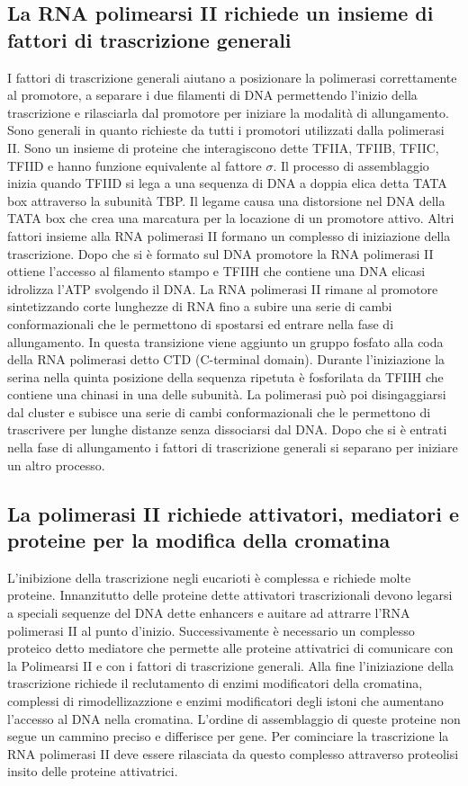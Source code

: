 \subsection{La RNA polimearsi II richiede un insieme di fattori di trascrizione generali}
I fattori di trascrizione generali aiutano a posizionare la polimerasi correttamente al promotore, a separare i due filamenti di DNA permettendo l'inizio della trascrizione e rilasciarla
dal promotore per iniziare la modalit\`a di allungamento. Sono generali in quanto richieste da tutti i promotori utilizzati dalla polimerasi II. Sono un insieme di proteine che 
interagiscono dette TFIIA, TFIIB, TFIIC, TFIID e hanno funzione equivalente al fattore $\sigma$. Il processo di assemblaggio inizia quando TFIID si lega a una sequenza di DNA a doppia 
elica detta TATA box attraverso la subunit\`a TBP. Il legame causa una distorsione nel DNA della TATA box che crea una marcatura per la locazione di un promotore attivo. Altri fattori
insieme alla RNA polimerasi II formano un complesso di iniziazione della trascrizione. Dopo che si \`e formato sul DNA promotore la RNA polimerasi II ottiene l'accesso al filamento 
stampo e TFIIH che contiene una DNA elicasi idrolizza l'ATP svolgendo il DNA. La RNA polimerasi II rimane al promotore sintetizzando corte lunghezze di RNA fino a subire una serie di
cambi conformazionali che le permettono di spostarsi ed entrare nella fase di allungamento. In questa transizione viene aggiunto un gruppo fosfato alla coda della RNA polimerasi detto 
CTD (C-terminal domain). Durante l'iniziazione la serina nella quinta posizione della sequenza ripetuta \`e fosforilata da TFIIH che contiene una chinasi in una delle subunit\`a. La
polimerasi pu\`o poi disingaggiarsi dal cluster e subisce una serie di cambi conformazionali che le permettono di trascrivere per lunghe distanze senza dissociarsi dal DNA. Dopo che si
\`e entrati nella fase di allungamento i fattori di trascrizione generali si separano per iniziare un altro processo. 
\subsection{La polimerasi II richiede attivatori, mediatori e proteine per la modifica della cromatina}
L'inibizione della trascrizione negli eucarioti \`e complessa e richiede molte proteine. Innanzitutto delle proteine dette attivatori trascrizionali devono legarsi a speciali sequenze
del DNA dette enhancers e auitare ad attrarre l'RNA polimerasi II al punto d'inizio. Successivamente \`e necessario un complesso proteico detto mediatore che permette alle proteine 
attivatrici di comunicare con la Polimearsi II e con i fattori di trascrizione generali. Alla fine l'iniziazione della trascrizione richiede il reclutamento di enzimi modificatori della
cromatina, complessi di rimodellizazzione e enzimi modificatori degli istoni che aumentano l'accesso al DNA nella cromatina. L'ordine di assemblaggio di queste proteine non segue un 
cammino preciso e differisce per gene. Per cominciare la trascrizione la RNA polimerasi II deve essere rilasciata da questo complesso attraverso proteolisi insito delle proteine 
attivatrici.
